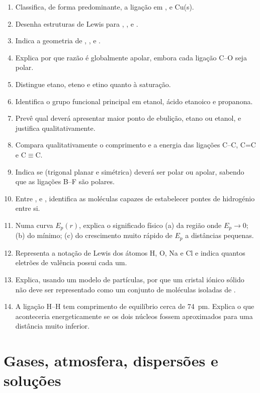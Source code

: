 \documentclass[11pt,a4paper,oneside]{book}
\begin{document}
\begin{exercicios}
\begin{enumerate}
  \item Classifica, de forma predominante, a ligação em ,  e Cu(s).
  \item Desenha estruturas de Lewis para , ,  e .
  \item Indica a geometria de , ,  e .
  \item Explica por que razão  é globalmente apolar, embora cada ligação C--O seja polar.
  \item Distingue etano, eteno e etino quanto à saturação.
  \item Identifica o grupo funcional principal em etanol, ácido etanoico e propanona.
  \item Prevê qual deverá apresentar maior ponto de ebulição, etano ou etanol, e justifica qualitativamente.
  \item Compara qualitativamente o comprimento e a energia das ligações C--C, C=C e C$\equiv$C.
  \item Indica se  (trigonal planar e simétrica) deverá ser polar ou apolar, sabendo que as ligações B--F são polares.
  \item Entre ,  e , identifica as moléculas capazes de estabelecer pontes de hidrogénio entre si.
  \item Numa curva $E_p(r)$, explica o significado físico (a) da região onde $E_p\to0$; (b) do mínimo; (c) do crescimento muito rápido de $E_p$ a distâncias pequenas.
  \item Representa a notação de Lewis dos átomos H, O, Na e Cl e indica quantos eletrões de valência possui cada um.
  \item Explica, usando um modelo de partículas, por que um cristal iónico sólido não deve ser representado como um conjunto de moléculas isoladas de .
  \item A ligação H--H tem comprimento de equilíbrio cerca de \SI{74}{pm}. Explica o que aconteceria energeticamente se os dois núcleos fossem aproximados para uma distância muito inferior.
\end{enumerate}
\end{exercicios}

\chapter{Gases, atmosfera, dispersões e soluções}
\end{document}
